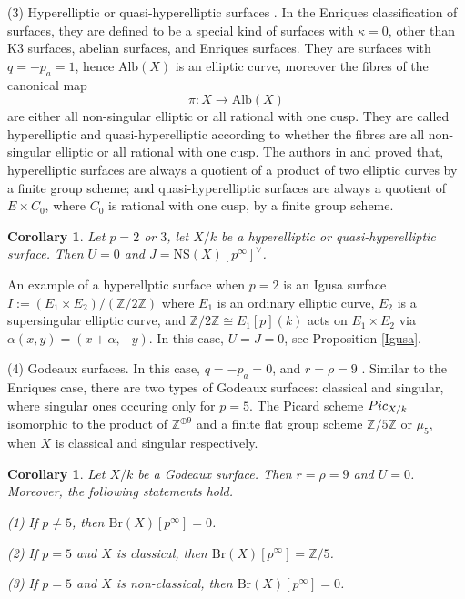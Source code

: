 \documentclass[a4paper,12pt,twoside]{report}
\newtheorem{corollary}[theorem]{Corollary}
\newcommand{\Z}{\mathbb{Z}}
\newcommand{\Br}{\mathrm{Br}}
\newcommand{\NS}{\mathrm{NS}}
\newcommand{\Alb}{\mathrm{Alb}}
\begin{document}
\medskip


(3) Hyperelliptic or quasi-hyperelliptic surfaces \cite[Section 3]{BM2} \cite[Section 2]{BM3}. 
In the Enriques classification of surfaces, they are defined to be a special kind of surfaces with $\kappa=0$, 
other than K3 surfaces, abelian surfaces, and Enriques surfaces. 
They are surfaces with $q=-p_a=1$, hence $\Alb(X)$ is an elliptic curve, moreover 
the fibres of the canonical map \[\pi:X\rightarrow \mathrm{Alb}(X)\]
are either all non-singular elliptic or all rational with one cusp. 
They are called hyperelliptic and quasi-hyperelliptic according to whether the fibres are all non-singular elliptic or all rational with one cusp. 
The authors in \cite{BM2} and \cite{BM3} proved that, 
hyperelliptic surfaces are always a quotient of a product of two elliptic curves by a finite group scheme; 
and quasi-hyperelliptic surfaces are always a quotient of $E\times C_0$, 
where $C_0$ is rational with one cusp, by a finite group scheme. 

\begin{corollary}\label{hyperelliptic}
    Let $p=2$ or $3$, let $X/k$ be a hyperelliptic or quasi-hyperelliptic surface. Then $U=0$ and $J=\NS(X)[p^\infty]^\vee$. 
\end{corollary}

An example of a hyperellptic surface when $p=2$ is an Igusa surface 
$I:=(E_1\times E_2)/(\Z/2\Z)$ where $E_1$ is an ordinary elliptic curve, $E_2$ is a supersingular elliptic curve, 
and $\Z/2\Z\cong E_1[p](k)$ acts on $E_1\times E_2$ via $\alpha(x,y)=(x+\alpha,-y)$. In this case, $U=J=0$, see Proposition \ref{Igusa}. 

(4) Godeaux surfaces. In this case, $q=-p_a=0$, and $r=\rho=9$ \cite{La}. Similar to the Enriques case, 
there are two types of Godeaux surfaces: classical and singular,
where singular ones occuring only for $p=5$.
The Picard scheme ${\rm Pic}_{X/k}$ isomorphic to
the product of $\Z^{\oplus 9}$ and a finite flat group scheme
$\Z/5\Z$ or $\mu_5$, when $X$ is classical and singular respectively. 

\begin{corollary}
    Let $X/k$ be a Godeaux surface. Then $r=\rho=9$ and $U=0$. Moreover, 
    the following statements hold. 

{\rm    (1)} If $p\neq 5$, then $\Br(X)[p^{\infty}]=0$.

{\rm    (2)} If $p=5$ and $X$ is classical, then $\Br(X)[p^{\infty}]=\Z/5$.

{\rm    (3)} If $p=5$ and $X$ is non-classical, then $\Br(X)[p^{\infty}]=0$.
\end{corollary}
\end{document}
